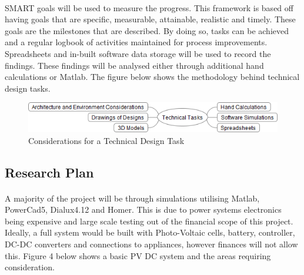 \paragraph{}
SMART goals will be used to measure the progress. This framework is based off having goals that are specific, measurable, attainable, realistic and timely. These goals are the milestones that are described. By doing so, tasks can be achieved and a regular logbook of activities maintained for process improvements. Spreadsheets and in-built software data storage will be used to record the findings. These findings will be analysed either through additional hand calculations or Matlab. The figure below shows the methodology behind technical design tasks.    

\begin{figure}[H]
\hfill\includegraphics[width = 160mm]{images/Practical_Planning_Rev2}\hspace*{\fill}
\caption{Considerations for a Technical Design Task}
\label{fig:PracProcedure}
\end{figure}     
\newpage

\subsection{Research Plan}

\paragraph{}
A majority of the project will be through simulations utilising Matlab, PowerCad5, Dialux4.12 and Homer. This is due to power systems electronics being expensive and large scale testing out of the financial scope of this project. Ideally, a full system would be built with Photo-Voltaic cells, battery, controller, DC-DC converters and connections to appliances, however finances will not allow this. Figure 4 below shows a basic PV DC system and the areas requiring consideration. 

